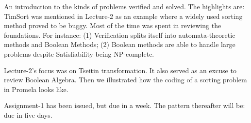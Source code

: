 
 An introduction to the kinds of problems verified and solved. The highlights are: TimSort was mentioned in Lecture-2 as an example where a widely used sorting method proved to be buggy. Most of the time was spent in reviewing the foundations. For instance: (1) Verification splits itself into automata-theoretic methods and Boolean Methods; (2) Boolean methods are able to handle large problems despite Satisfiability being NP-complete.
 
 Lecture-2's focus was on Tseitin transformation. It also served as an excuse to review Boolean Algebra. Then we illustrated how the coding of a sorting problem in Promela looks like.
 
 Assignment-1 has been issued, but due in a week.
 The pattern thereafter will be: due in five days.